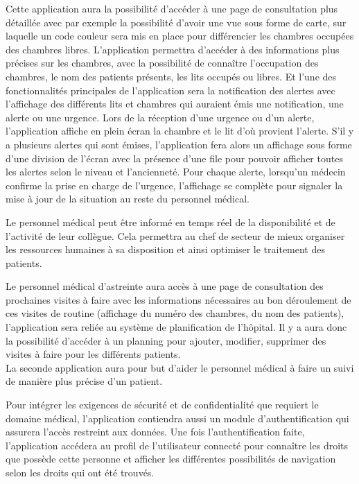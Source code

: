 Cette application aura la possibilité d’accéder à une page de consultation plus détaillée avec par exemple la possibilité d’avoir une vue sous forme de carte, sur laquelle un code couleur sera mis en place pour différencier les chambres occupées des chambres libres. L’application permettra d’accéder à des informations plus précises sur les chambres, avec la possibilité de connaître l’occupation des chambres, le nom des patients présents, les lits occupés ou libres. Et l’une des fonctionnalités principales de l’application sera la notification des alertes avec l’affichage des différents lits et chambres qui auraient émis une notification, une alerte ou une urgence. Lors de la réception d’une urgence ou d’un alerte, l’application affiche en plein écran la chambre et le lit d’où provient l’alerte. S’il y a plusieurs alertes qui sont émises, l’application fera alors un affichage sous forme d’une division de l’écran avec la présence d’une file pour pouvoir afficher toutes les alertes selon le niveau et l’ancienneté. Pour chaque alerte, lorsqu’un médecin confirme la prise en charge de l’urgence, l’affichage se complète pour signaler la mise à jour de la situation au reste du personnel médical.

Le personnel médical peut être informé en temps réel de la disponibilité et de l’activité de leur collègue. Cela permettra au chef de secteur de mieux organiser les ressources humaines à sa disposition et ainsi optimiser le traitement des patients.

Le personnel médical d’astreinte aura accès à une page de consultation des prochaines visites à faire avec les informations nécessaires au bon déroulement de ces visites de routine (affichage du numéro des chambres, du nom des patients), l’application sera reliée au système de planification de l’hôpital. Il y a aura donc la possibilité d’accéder à un planning pour ajouter, modifier, supprimer des visites à faire pour les différents patients.
\\

La seconde application aura pour but d’aider le personnel médical à faire un suivi de manière plus précise d’un patient.

Pour intégrer les exigences de sécurité et de confidentialité que requiert le domaine médical, l’application contiendra aussi un module d’authentification qui assurera l’accès restreint aux données. Une fois l’authentification faite, l’application accédera au profil de l’utilisateur connecté pour connaître les droits que possède cette personne et afficher les différentes possibilités de navigation selon les droits qui ont été trouvés.

